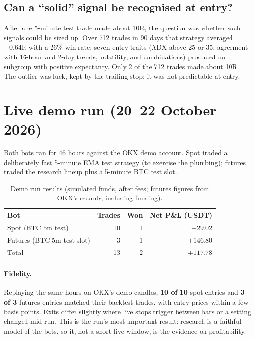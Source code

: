 \documentclass[11pt,a4paper]{article}
\begin{document}
\subsection{Can a ``solid'' signal be recognised at entry?}\label{sec:solid}
After one 5-minute test trade made about 10R, the question was whether such signals could be
sized up. Over 712 trades in 90 days that strategy averaged $-0.64$R with a 26\% win rate; seven
entry traits (ADX above 25 or 35, agreement with 16-hour and 2-day trends, volatility, and
combinations) produced no subgroup with positive expectancy. Only 2 of the 712 trades made about
10R. The outlier was luck, kept by the trailing stop; it was not predictable at entry.

\section{Live demo run (20--22 October 2026)}\label{sec:demo}
Both bots ran for 46 hours against the OKX demo account. Spot traded a deliberately fast
5-minute EMA test strategy (to exercise the plumbing); futures traded the research lineup plus a
5-minute BTC test slot.

\begin{table}[h]
\centering\small
\begin{tabular}{@{}lrrr@{}}
\toprule
Bot & Trades & Won & Net P\&L (USDT) \\
\midrule
Spot (BTC 5m test) & 10 & 1 & $-29.02$ \\
Futures (BTC 5m test slot) & 3 & 1 & $+146.80$ \\
\midrule
Total & 13 & 2 & $+117.78$ \\
\bottomrule
\end{tabular}
\caption{Demo run results (simulated funds, after fees; futures figures from OKX's records,
including funding).}
\end{table}

\paragraph{Fidelity.} Replaying the same hours on OKX's demo candles, \textbf{10 of 10} spot
entries and \textbf{3 of 3} futures entries matched their backtest trades, with entry prices
within a few basis points. Exits differ slightly where live stops trigger between bars or a
setting changed mid-run. This is the run's most important result: research is a faithful model
of the bots, so it, not a short live window, is the evidence on profitability.
\end{document}
